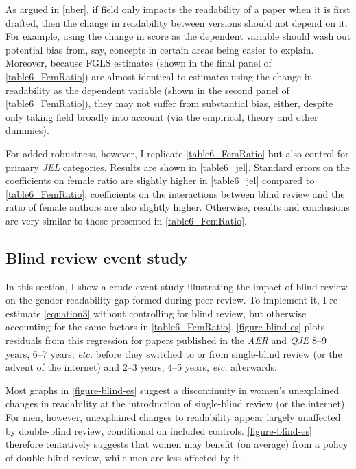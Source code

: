 \begin{appendices}
\begin{refsection}
As argued in \autoref{nber}, if field only impacts the readability of a paper when it is first drafted, then the change in readability between versions should not depend on it. For example, using the change in score as the dependent variable should wash out potential bias from, say, concepts in certain areas being easier to explain. Moreover, because FGLS estimates (shown in the final panel of \autoref{table6_FemRatio}) are almost identical to estimates using the change in readability as the dependent variable (shown in the second panel of \autoref{table6_FemRatio}), they may not suffer from substantial bias, either, despite only taking field broadly into account (via the empirical, theory and other dummies).

For added robustness, however, I replicate \autoref{table6_FemRatio} but also control for primary \emph{JEL} categories. Results are shown in \autoref{table6_jel}. Standard errors on the coefficients on female ratio are slightly higher in \autoref{table6_jel} compared to \autoref{table6_FemRatio}; coefficients on the interactions between blind review and the ratio of female authors are also slightly higher. Otherwise, results and conclusions are very similar to those presented in \autoref{table6_FemRatio}.



\clearpage


\subsection{Blind review event study}
\label{appendixeventstudy}

In this section, I show a crude event study illustrating the impact of blind review on the gender readability gap formed during peer review. To implement it, I re-estimate \autoref{equation3} without controlling for blind review, but otherwise accounting for the same factors in \autoref{table6_FemRatio}. \autoref{figure-blind-es} plots residuals from this regression for papers published in the \emph{AER} and \emph{QJE} 8--9 years, 6--7 years, \emph{etc.} before they switched to or from single-blind review (or the advent of the internet) and 2--3 years, 4--5 years, \emph{etc.} afterwards.



Most graphs in \autoref{figure-blind-es} suggest a discontinuity in women's unexplained changes in readability at the introduction of single-blind review (or the internet). For men, however, unexplained changes to readability appear largely unaffected by double-blind review, conditional on included controls. \autoref{figure-blind-es} therefore tentatively suggests that women may benefit (on average) from a policy of double-blind review, while men are less affected by it.


\end{refsection}
\end{appendices}
